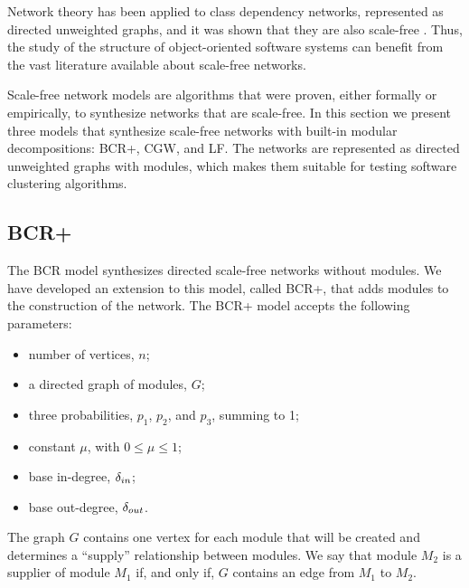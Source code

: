 Network theory has been applied to class dependency networks, represented as
directed unweighted graphs, and it was shown that they are also scale-free
\cite{Myers2003,Valverde2002}. Thus, the study of the structure of
object-oriented software systems can benefit from the vast literature available
about scale-free networks.

Scale-free network models are algorithms that were proven, either formally or
empirically, to synthesize networks that are scale-free. In this section we
present three models that synthesize scale-free networks with built-in modular
decompositions: BCR+, CGW, and LF. The networks are represented as directed
unweighted graphs with modules, which makes them suitable for testing software
clustering algorithms.



\subsection{BCR+}

The BCR model \cite{Bollobas2003} synthesizes directed scale-free networks
without modules. We have developed an extension to this model, called BCR+, that
adds modules to the construction of the network. The BCR+ model accepts the
following parameters:

\begin{itemize}
\item number of vertices, $n$;
\item a directed graph of modules, $G$;
\item three probabilities, $p_1$, $p_2$, and $p_3$, summing to 1;
\item constant $\mu$, with $0 \le \mu \le 1$;
\item base in-degree, $\delta_{in}$;
\item base out-degree, $\delta_{out}$.
\end{itemize}

The graph $G$ contains one vertex for each module that will be created and
determines a ``supply'' relationship between modules. We say that module $M_2$
is a supplier of module $M_1$ if, and only if, $G$ contains an edge from $M_1$
to $M_2$.  

